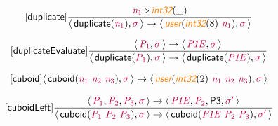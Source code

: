 \documentclass[10pt,leqno,fleqn]{article}
\newcommand{\artVariable}[1]{\mbox{\color{purple}\em #1\/}}
\newcommand{\artConstructor}[1]{\mbox{\sf #1}}
\newcommand{\artSpecial}[1]{\mbox{\color{orange}\sf\em #1}}
\begin{document}
\begin{equation}
\tag*{[\artConstructor{\sf duplicate}]}
\begin{split}\frac{ \artVariable{n$_{1}$}\triangleright \artSpecial{int32}(\_) }{\langle\, \artConstructor{\sf duplicate}(\artVariable{n$_{1}$}), \artVariable{$\sigma$}\,\rangle \rightarrow \langle\, \artSpecial{user}(\artSpecial{int32}(8)\ \artVariable{n$_{1}$}), \artVariable{$\sigma$}\,\rangle }
\end{split}
\end{equation}

\begin{equation}
\tag*{[\artConstructor{\sf duplicateEvaluate}]}
\begin{split}\frac{\langle\, \artVariable{P$_{1}$}, \artVariable{$\sigma$}\,\rangle \rightarrow \langle\, \artVariable{P1E}, \artVariable{$\sigma$}\,\rangle }{\langle\, \artConstructor{\sf duplicate}(\artVariable{P$_{1}$}), \artVariable{$\sigma$}\,\rangle \rightarrow \langle\, \artConstructor{\sf duplicate}(\artVariable{P1E}), \artVariable{$\sigma$}\,\rangle }
\end{split}
\end{equation}

\begin{equation}
\tag*{[\artConstructor{\sf cuboid}]}
\begin{split}\langle\, \artConstructor{\sf cuboid}(\artVariable{n$_{1}$}\ \artVariable{n$_{2}$}\ \artVariable{n$_{3}$}), \artVariable{$\sigma$}\,\rangle \rightarrow \langle\, \artSpecial{user}(\artSpecial{int32}(2)\ \artVariable{n$_{1}$}\ \artVariable{n$_{2}$}\ \artVariable{n$_{3}$}), \artVariable{$\sigma$}\,\rangle 
\end{split}
\end{equation}

\begin{equation}
\tag*{[\artConstructor{\sf cuboidLeft}]}
\begin{split}\frac{\langle\, \artVariable{P$_{1}$}, \artVariable{P$_{2}$}, \artVariable{P$_{3}$}, \artVariable{$\sigma$}\,\rangle \rightarrow \langle\, \artVariable{P1E}, \artVariable{P$_{2}$}, \artConstructor{\sf P3}, \artVariable{$\sigma$\/$^\prime$}\,\rangle }{\langle\, \artConstructor{\sf cuboid}(\artVariable{P$_{1}$}\ \artVariable{P$_{2}$}\ \artVariable{P$_{3}$}), \artVariable{$\sigma$}\,\rangle \rightarrow \langle\, \artConstructor{\sf cuboid}(\artVariable{P1E}\ \artVariable{P$_{2}$}\ \artVariable{P$_{3}$}), \artVariable{$\sigma$\/$^\prime$}\,\rangle }
\end{split}
\end{equation}
\end{document}
